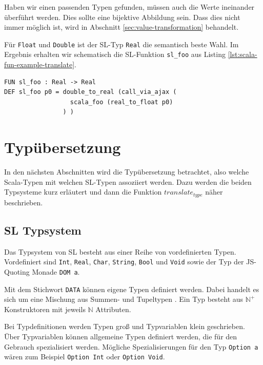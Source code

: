 \documentclass[12pt,bibtotoc]{scrreprt}
\begin{document}
Haben wir einen passenden Typen gefunden, müssen auch die Werte ineinander überführt werden. Dies sollte eine bijektive Abbildung sein. Dass dies nicht immer möglich ist, wird in Abschnitt \ref{sec:value-transformation} behandelt.

Für \lstinline!Float! und \lstinline!Double! ist der SL-Typ \lstinline!Real! die semantisch beste Wahl. Im Ergebnis erhalten wir schematisch die SL-Funktion \lstinline!sl_foo! aus Listing \ref{lst:scala-fun-example-translate}.

\begin{lstlisting}[caption=Übersetzung von scala\_foo, label=lst:scala-fun-example-translate]
FUN sl_foo : Real -> Real
DEF sl_foo p0 = double_to_real (call_via_ajax (
                  scala_foo (real_to_float p0) 
                ) )
\end{lstlisting}

\section{Typübersetzung}
\label{sec:type-translation}

In den nächsten Abschnitten wird die Typübersetzung betrachtet, also welche Scala-Typen mit welchen SL-Typen assoziiert werden. Dazu werden die beiden Typsysteme kurz erläutert und dann die Funktion $translate_{type}$ näher beschrieben.

\subsection{SL Typsystem}
\label{subsec:sl-typesystem}

Das Typsystem von SL besteht aus einer Reihe von vordefinierten Typen. Vordefiniert sind \lstinline!Int!, \lstinline!Real!, \lstinline!Char!, \lstinline!String!, \lstinline!Bool! und \lstinline!Void! sowie der Typ der JS-Quoting Monade \lstinline!DOM a!.

Mit dem Stichwort \lstinline!DATA! können eigene Typen definiert werden. Dabei handelt es sich um eine Mischung aus Summen- und Tupeltypen \cite[S.119f u. S. 123]{Pepper2007}. Ein Typ besteht aus $\mathbb{N}^+$ Konstruktoren mit jeweils $\mathbb{N}$ Attributen.

Bei Typdefinitionen werden Typen groß und Typvariablen klein geschrieben. Über Typvariablen können allgemeine Typen definiert werden, die für den Gebrauch spezialisiert werden. Mögliche Spezialisierungen für den Typ \lstinline!Option a! wären zum Beispiel \lstinline!Option Int! oder \lstinline!Option Void!.
\end{document}
